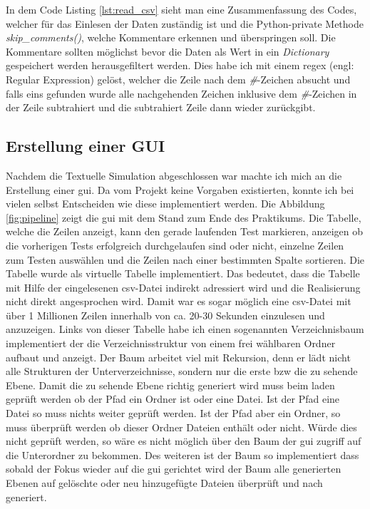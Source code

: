 
In dem Code Listing \ref{lst:read_csv} sieht man eine Zusammenfassung des Codes, welcher für 
das Einlesen der Daten zuständig ist und die Python-private Methode \textit{skip\_comments()}, 
welche Kommentare erkennen und überspringen soll. Die Kommentare sollten möglichst bevor die 
Daten als Wert in ein \textit{Dictionary} gespeichert werden herausgefiltert werden. Dies habe 
ich mit einem \ac{regex} (engl: Regular Expression) gelöst, welcher die Zeile nach dem 
\textit{\#}-Zeichen absucht und falls eins gefunden wurde alle nachgehenden Zeichen inklusive 
dem \textit{\#}-Zeichen in der Zeile subtrahiert und die subtrahiert Zeile dann wieder 
zurückgibt.


\subsection{Erstellung einer GUI}
\label{subsec:create_gui}

Nachdem die Textuelle Simulation abgeschlossen war machte ich mich an die Erstellung einer 
\ac{gui}. Da vom Projekt keine Vorgaben existierten, konnte ich bei vielen selbst Entscheiden 
wie diese implementiert werden.
Die Abbildung \ref{fig:pipeline} zeigt die \ac{gui} mit dem Stand zum Ende des Praktikums. Die Tabelle, welche die Zeilen anzeigt, kann den gerade laufenden Test 
markieren, anzeigen ob die vorherigen Tests erfolgreich durchgelaufen sind oder nicht, einzelne 
Zeilen zum Testen auswählen und die Zeilen nach einer bestimmten Spalte sortieren. 
Die Tabelle wurde als virtuelle Tabelle implementiert. Das bedeutet, dass die Tabelle mit Hilfe 
der eingelesenen \ac{csv}-Datei indirekt adressiert wird und die Realisierung nicht direkt 
angesprochen wird. Damit war es sogar möglich eine \ac{csv}-Datei mit über 1 Millionen Zeilen 
innerhalb von ca. 20-30 Sekunden einzulesen und anzuzeigen. Links von dieser Tabelle habe ich einen sogenannten Verzeichnisbaum implementiert der die Verzeichnisstruktur von einem frei wählbaren Ordner aufbaut und anzeigt. Der Baum arbeitet viel mit Rekursion, denn er lädt nicht alle Strukturen der Unterverzeichnisse, sondern nur die erste \ac{bzw} die zu sehende Ebene. Damit die zu sehende Ebene richtig generiert wird muss beim laden geprüft werden ob der Pfad ein Ordner ist oder eine Datei. Ist der Pfad eine Datei so muss nichts weiter geprüft werden. Ist der Pfad aber ein Ordner, so muss überprüft werden ob dieser Ordner Dateien enthält oder nicht. Würde dies nicht geprüft werden, so wäre es nicht möglich über den Baum der \ac{gui} zugriff auf die Unterordner zu bekommen. Des weiteren ist der Baum so implementiert dass sobald der Fokus wieder auf die \ac{gui} gerichtet wird der Baum alle generierten Ebenen auf gelöschte oder neu hinzugefügte Dateien überprüft und nach generiert.

